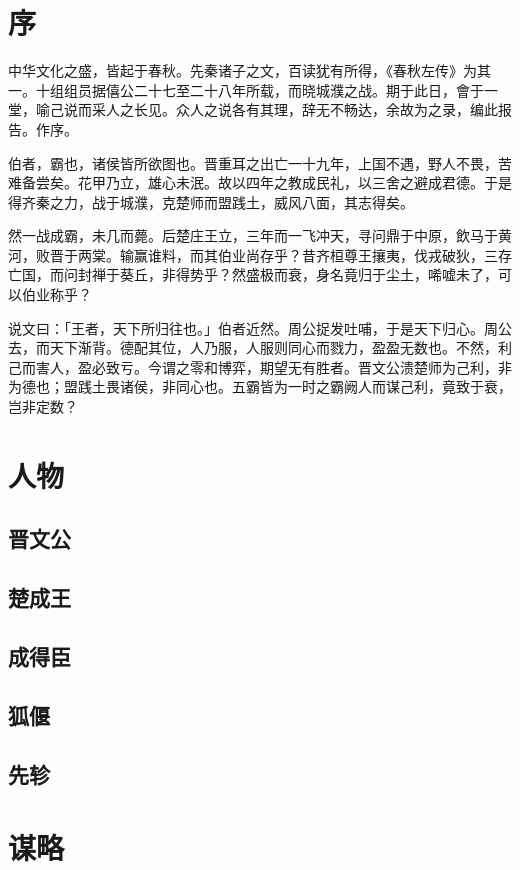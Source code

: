 \documentclass{article}
\date{}
\begin{document}
\makecover
\tableofcontents

\section{序}

中华文化之盛，皆起于春秋。先秦诸子之文，百读犹有所得，《春秋左传》为其一。十组组员据僖公二十七至二十八年所载，而晓城濮之战。期于此日，會于一堂，喻己说而采人之长见。众人之说各有其理，辞无不畅达，余故为之录，编此报告。作序。

伯者，霸也，诸侯皆所欲图也。晋重耳之出亡一十九年，上国不遇，野人不畏，苦难备尝矣。花甲乃立，雄心未泯。故以四年之教成民礼，以三舍之避成君德。于是得齐秦之力，战于城濮，克楚师而盟践土，威风八面，其志得矣。

然一战成霸，未几而薨。后楚庄王立，三年而一飞冲天，寻问鼎于中原，飲马于黄河，败晋于两棠。输赢谁料，而其伯业尚存乎？昔齐桓尊王攘夷，伐戎破狄，三存亡国，而问封禅于葵丘，非得势乎？然盛极而衰，身名竟归于尘土，唏嘘未了，可以伯业称乎？

说文曰：「王者，天下所归往也。」伯者近然。周公捉发吐哺，于是天下归心。周公去，而天下渐背。德配其位，人乃服，人服则同心而戮力，盈盈无数也。不然，利己而害人，盈必致亏。今谓之零和博弈，期望无有胜者。晋文公溃楚师为己利，非为德也；盟践土畏诸侯，非同心也。五霸皆为一时之霸阙人而谋己利，竟致于衰，岂非定数？

\section{人物}

\subsection{晋文公}

\subsection{楚成王}

\subsection{成得臣}

\subsection{狐偃}

\subsection{先轸}

\section{谋略}
\end{document}
